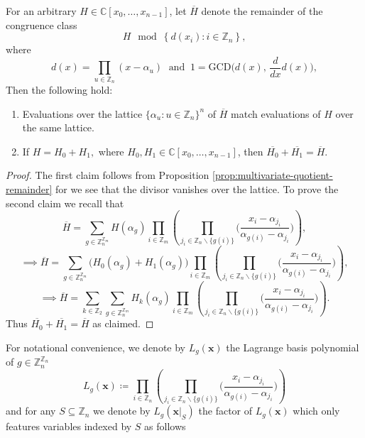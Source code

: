  \begin{proposition}\label{prop:ring-homomorphism}
For an arbitrary $H\in\mathbb{C}\left[x_{0},\ldots,x_{n-1}\right]$, let $\overline{H}$ denote
the {remainder} of the congruence class 
\[
H\mod\left\{ d(x_{i}):i\in\mathbb{Z}_{n}\right\} ,
\]
where
\[
d(x)=\prod_{u\in\mathbb{Z}_{n}}(x-\alpha_{u})\;\text{ and }\:1=\text{GCD}\big(d(x),\,\frac{d}{dx}d(x)\big),
\]
Then the following hold:
\begin{enumerate}
    \item Evaluations over the  lattice $\{\alpha_{u}:u\in\mathbb{Z}_{n}\}^{n}$ of $\overline{H}$ match evaluations of $H$ over the same lattice. 
    \item If $H = H_0 + H_1,$ where $H_0, H_1 \in \mathbb{C}\left[x_{0},\ldots,x_{n-1}\right]$, then $\overline{H_0} + \overline{H_1} = \overline{H}$.
\end{enumerate}
 \end{proposition}
\begin{proof}
  The first claim follows from Proposition \ref{prop:multivariate-quotient-remainder} for we see that the divisor vanishes over the lattice. To prove the second claim we recall that
  \[
\overline{H}=\sum_{g\in\mathbb{Z}_{n}^{\mathbb{Z}_{m}}}H(\alpha_{g})\prod_{i\in\mathbb{Z}_{m}}\left(\prod_{j_{i}\in\mathbb{Z}_{n}\backslash\{g(i)\}}\bigg(\frac{x_{i}-\alpha_{j_{i}}}{\alpha_{g(i)}-\alpha_{j_{i}}}\bigg)\right),
  \]
  \[
  \implies\overline{H}=\sum_{g\in\mathbb{Z}_{n}^{\mathbb{Z}_{m}}}\big(H_{0}(\alpha_{g})+H_{1}(\alpha_{g})\big)\prod_{i\in\mathbb{Z}_{m}}\left(\prod_{j_{i}\in\mathbb{Z}_{n}\backslash\{g(i)\}}\bigg(\frac{x_{i}-\alpha_{j_{i}}}{\alpha_{g(i)}-\alpha_{j_{i}}}\bigg)\right),
  \]
  \[
  \implies\overline{H}=\sum_{k\in\mathbb{Z}_{2}}\sum_{g\in\mathbb{Z}_{n}^{\mathbb{Z}_{m}}}H_{k}(\alpha_{g})\prod_{i\in\mathbb{Z}_{m}}\left(\prod_{j_{i}\in\mathbb{Z}_{n}\backslash\{g(i)\}}\bigg(\frac{x_{i}-\alpha_{j_{i}}}{\alpha_{g(i)}-\alpha_{j_{i}}}\bigg)\right).
  \]
  Thus $\overline{H_0} + \overline{H_1} = \overline{H}$ as claimed.
\end{proof}
For notational convenience, we denote by $L_{g}(\mathbf{x})$ the Lagrange basis polynomial of $g\in\mathbb{Z}_{n}^{\mathbb{Z}_{n}}$  
\[
L_{g}(\mathbf{x})\coloneq\prod_{i\in\mathbb{Z}_{n}}\left(\prod_{j_{i}\in\mathbb{Z}_{n}\backslash\{g(i)\}}\bigg(\frac{x_{i}-\alpha_{j_{i}}}{\alpha_{g(i)}-\alpha_{j_{i}}}\bigg)\right)
\]
and for any $S\subseteq \mathbb{Z}_n$ we denote  by $L_{g}(\mathbf{x}|_{S})$ the factor of $L_{g}(\mathbf{x})$ which only features variables indexed by $S$ as follows
